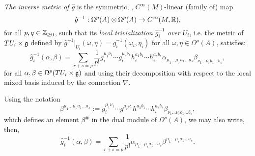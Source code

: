 \begin{definition}
\emph{The inverse metric of $\hat g$} is the symmetric, , $C^\infty(M)$-linear (family of) map
\begin{equation}
    \hat g^{-1}: \Omega^p(A) \otimes \Omega^p(A) \to C^\infty(M, \mathbb{R}),
\end{equation}
for all $p, q \in \mathbb{Z}_{\geq 0}$, such that its \emph{local trivialization $\hat g_i^{-1}$ over $U_i$}, i.e. the metric of $TU_i \times \mathfrak{g}$ defined by $\hat g^{-1}|_{U_i}(\omega, \eta) = \hat g_i^{-1} (\omega_i, \eta_i)$ for all $\omega, \eta \in \Omega^p(A)$, satisfies:
\begin{equation*}
    \hat g_i^{-1} (\alpha, \beta) 
    = \sum_{r+s = p} \frac{1}{p!}  g_i^{\mu_1 \nu_1} \cdots g_i^{\mu_r \nu_r} h_i^{a_1 b_1} \cdots h_i^{a_s b_s} \alpha_{\mu_1 \dots \mu_r a_1 \dots a_s} \beta_{\nu_1 \dots \nu_r b_1 \dots  b_s},
\end{equation*}
for all $\alpha, \beta \in \Omega^p(TU_i \times \mathfrak{g})$ and using their decomposition with respect to the local mixed basis induced by the connection $\nabla$. 

Using the notation
\begin{equation}\label{equationNotationRaisingIndices}
    \beta^{\mu_1 \dots \mu_r a_1 \dots a_s} := g_i^{\mu_1 \nu_1} \cdots g^{\mu_r \nu_r} h^{a_1 b_1} \cdots h_i^{a_s b_s} \beta_{\nu_1 \dots \nu_r b_1 \dots  b_s},
\end{equation}
which defines an element $\beta^\#$ in the dual module of $\Omega^p(A)$, we may also write, then,
\begin{equation}
    \hat g_i^{-1}(\alpha, \beta) = \sum_{r+s = p} \frac{1}{p!} \alpha_{\mu_1 \dots \mu_r a_1 \dots a_s} \beta^{\mu_1 \dots \mu_r a_1 \dots  a_s}.
\end{equation}
\end{definition}

